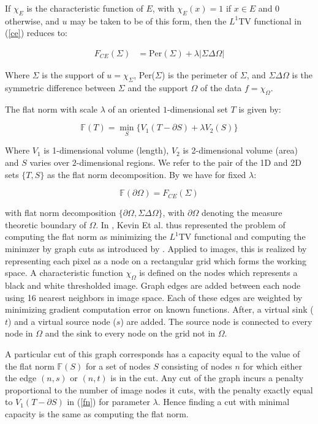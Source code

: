 \documentclass[12pt]{article}
\begin{document}
If $\chi_E$ is the characteristic function of $E$, with $\chi_E(x) = 1$ if $x \in E$ and $0$ otherwise, and $u$ may be taken to be of this form, then the $L^1$TV functional in (\ref{ce}) reduces to:

\begin{align*}
F_{CE}(\Sigma) &= \text{Per}(\Sigma) + \lambda|\Sigma \Delta \Omega|
\end{align*}

Where $\Sigma$ is the support of $u = \chi_\Sigma$, Per($\Sigma$) is the perimeter of $\Sigma$, and $\Sigma \Delta \Omega$ is the symmetric difference between $\Sigma$ and the support $\Omega$ of the data $f = \chi_\Omega$. 

The flat norm with scale $\lambda$ of an oriented $1$-dimensional set $T$ is given by:

\begin{equation} \label{fn}
\mathbb{F}(T) = \min_S \{V_1(T-\partial S) + \lambda V_2(S)\}
\end{equation}

Where $V_1$ is 1-dimensional volume (length), $V_2$ is 2-dimensional volume (area) and $S$ varies over $2$-dimensional regions. We refer to the pair of the 1D and 2D sets $\{T,S\}$ as the flat norm decomposition. By \cite{Morgan_2007} we have for fixed $\lambda$:

\begin{equation}
\mathbb{F}(\partial \Omega) = F_{CE}(\Sigma)
\end{equation}

with flat norm decomposition $\{\partial \Omega, \Sigma \Delta \Omega\}$, with $\partial \Omega$ denoting the measure theoretic boundary of $\Omega$. In \cite{shapes}, Kevin Et al. thus represented the problem of computing the flat norm as minimizing the $L^1$TV functional and computing the minimzer by graph cuts as introduced by \cite{kolmogorov}. Applied to images, this is realized by representing each pixel as a node on a rectangular grid which forms the working space. A characteristic function $\chi_\Omega$ is defined on the nodes which represents a black and white thresholded image. Graph edges are added between each node using 16 nearest neighbors in image space. Each of these edges are weighted by minimizing gradient computation error on known functions. After, a virtual sink ($t$) and a virtual source node ($s$) are added. The source node is connected to every node in $\Omega$ and the sink to every node on the grid not in $\Omega$. 

A particular cut of this graph corresponds has a capacity equal to the value of the flat norm $\mathbb{F}(S)$ for a set of nodes $S$ consisting of nodes $n$ for which either the edge $(n,s)$ or $(n,t)$ is in the cut. Any cut of the graph incurs a penalty proportional to the number of image nodes it cuts, with the penalty exactly equal to $V_1(T-\partial S)$ in (\ref{fn}) for parameter $\lambda$. Hence finding a cut with minimal capacity is the same as computing the flat norm. 
\end{document}
